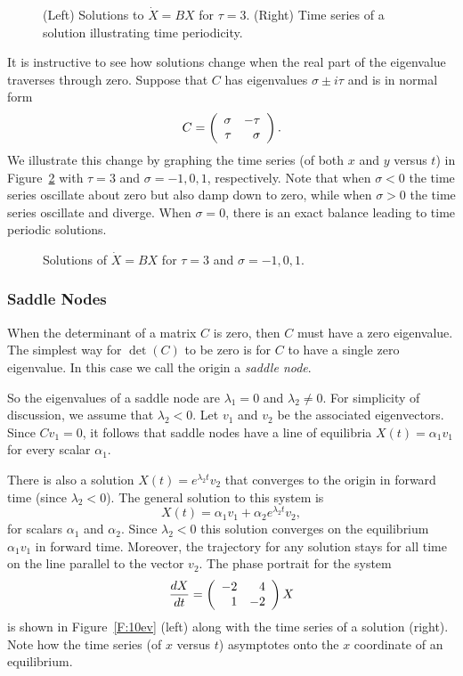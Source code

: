 \documentclass{ximera}
\begin{document}
\begin{figure}[htb]
     \centerline{%
     }
     \caption{(Left) Solutions to $\dot{X}=BX$ for $\tau=3$.
	(Right) Time series of a solution illustrating time periodicity.}
     \label{F:center}
\end{figure}

It is instructive to see how solutions change when the real part of the
eigenvalue traverses through zero.  Suppose that $C$ has eigenvalues
$\sigma\pm i\tau$ and is in normal form
\[
C = \left(\begin{array}{rr} \sigma & -\tau\\ \tau &\sigma\end{array}\right).
\]
We illustrate this change by graphing the time series (of both $x$ and $y$
versus $t$) in Figure~\ref{F:spiraling} with $\tau=3$ and $\sigma=-1,0,1$,
respectively. Note that when $\sigma<0$ the time series oscillate about zero
but also damp down to zero, while when $\sigma>0$ the time series oscillate
and diverge.  When $\sigma = 0$, there is an exact balance leading to time
periodic solutions.

\begin{figure}[htb]
     \centerline{%
     }
     \caption{Solutions of $\dot{X}=BX$ for $\tau=3$ and $\sigma=-1,0,1$.}
     \label{F:spiraling}
\end{figure}

\subsubsection*{Saddle Nodes}

When the determinant of a matrix $C$ is zero, then $C$ must have a zero
eigenvalue.  The simplest way for $\det(C)$ to be zero is for $C$ to have a
single zero eigenvalue.  In this case we call the origin a {\em saddle node}.

So the eigenvalues of a saddle node are $\lambda_1=0$ and $\lambda_2\neq 0$.
For simplicity of discussion, we assume that $\lambda_2<0$.  Let $v_1$ and
$v_2$ be the associated eigenvectors.  Since $Cv_1=0$, it follows that saddle
nodes have a line of equilibria
$X(t)=\alpha_1v_1$ for every scalar $\alpha_1$.

There is also a solution $X(t)=e^{\lambda_2 t}v_2$ that converges to the
origin in forward time (since $\lambda_2<0$).  The general solution to this
system is
\[
X(t) = \alpha_1 v_1 + \alpha_2 e^{\lambda_2 t}v_2,
\]
for scalars $\alpha_1$ and $\alpha_2$.  Since $\lambda_2<0$ this solution
converges on the equilibrium $\alpha_1 v_1$ in forward time.  Moreover,
the trajectory for any solution stays for all time on the line parallel
to the vector $v_2$.  The phase portrait
for the system
\begin{equation}  \label{e:10ev}
\frac{dX}{dt} = \left(\begin{array}{rr} -2 & 4\\ 1 &-2\end{array}\right) X
\end{equation}
is shown in Figure~\ref{F:10ev} (left) along with the time series
of a solution (right).  Note how the time series (of $x$ versus $t$)
asymptotes onto the $x$ coordinate of an equilibrium.
\end{document}
